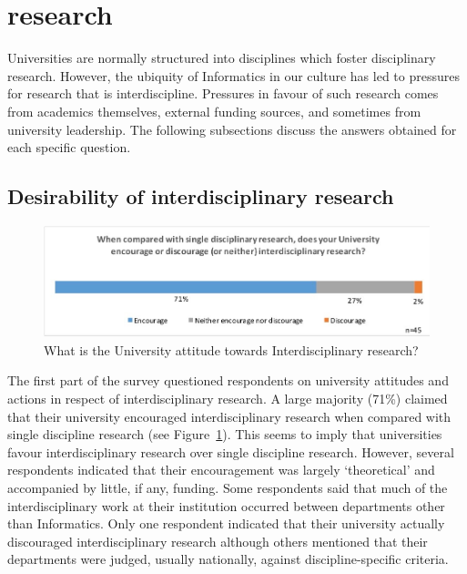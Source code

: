 \section{research}

Universities are normally structured into disciplines which foster disciplinary research. However, the ubiquity of Informatics in our culture has led to pressures for research that is interdiscipline. Pressures in favour of such research comes from academics themselves, external funding sources, and sometimes from university leadership. The 
following subsections discuss the answers obtained for each specific
question.

\subsection{Desirability of interdisciplinary research}

\begin{figure}[h]
\centering
\includegraphics[width = \linewidth]{charts/1a.jpg}
\caption{What is the University attitude towards Interdisciplinary research?}
\label{sect1:Uattitude}
\end{figure}

The first part of the survey questioned respondents on university attitudes and actions in respect of interdisciplinary research. A large majority (71\%) claimed that their university encouraged interdisciplinary research when compared with single discipline research (see Figure~\ref{sect1:Uattitude}). This seems to imply that universities favour interdisciplinary research over single discipline research.  However, several respondents indicated that their encouragement was largely `theoretical' and accompanied by little, if any, funding. Some respondents said that much of the interdisciplinary work at their institution occurred between departments other than Informatics. Only one respondent indicated that their university actually discouraged interdisciplinary research although others mentioned that their departments were judged, usually nationally, against discipline-specific criteria.


